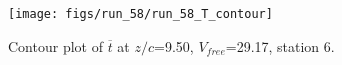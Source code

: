 \begin{figure}[H]
\centering
\texttt{[image: figs/run\_58/run\_58\_T\_contour]}
\caption{Contour plot of $\overline{t}$ at $z/c$=9.50, $V_{free}$=29.17, station 6.}
\label{fig:run_58_T_contour}
\end{figure}


